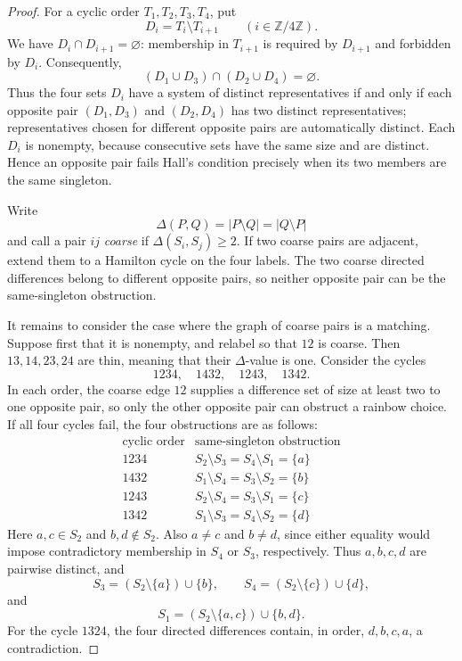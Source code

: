 \documentclass[11pt]{amsart}
\theoremstyle{definition}
\begin{document}
\begin{proof}
For a cyclic order $T_1,T_2,T_3,T_4$, put
\[
  D_i=T_i\setminus T_{i+1}
  \qquad(i\in\mathbb Z/4\mathbb Z).
\]
We have $D_i\cap D_{i+1}=\varnothing$: membership in $T_{i+1}$
is required by $D_{i+1}$ and forbidden by $D_i$.  Consequently,
\[
  (D_1\cup D_3)\cap(D_2\cup D_4)=\varnothing.
\]
Thus the four sets $D_i$ have a system of distinct representatives if
and only if each opposite pair $(D_1,D_3)$ and $(D_2,D_4)$ has two
distinct representatives; representatives chosen for different opposite
pairs are automatically distinct.  Each $D_i$ is nonempty, because
consecutive sets have the same size and are distinct.  Hence an opposite
pair fails Hall's condition precisely when its two members are the same
singleton.

Write
\[
  \Delta(P,Q)=|P\setminus Q|=|Q\setminus P|
\]
and call a pair $ij$ \emph{coarse} if $\Delta(S_i,S_j)\ge2$.  If two coarse pairs are adjacent, extend them to a Hamilton cycle on the four labels.  The two coarse directed differences belong to different opposite pairs, so neither opposite pair can be the same-singleton obstruction.

It remains to consider the case where the graph of coarse pairs is a matching.  Suppose first that it is nonempty, and relabel so that $12$ is coarse.  Then $13,14,23,24$ are thin, meaning that their $\Delta$-value is one.  Consider the cycles
\[
  1234,\quad1432,\quad1243,\quad1342.
\]
In each order, the coarse edge $12$ supplies a difference set of size at
least two to one opposite pair, so only the other opposite pair can
obstruct a rainbow choice.  If all four cycles fail, the four obstructions
are as follows:
\[
\begin{array}{c|c}
\text{cyclic order}&\text{same-singleton obstruction}\\ \hline
1234&S_2\setminus S_3=S_4\setminus S_1=\{a\}\\
1432&S_1\setminus S_4=S_3\setminus S_2=\{b\}\\
1243&S_2\setminus S_4=S_3\setminus S_1=\{c\}\\
1342&S_1\setminus S_3=S_4\setminus S_2=\{d\}
\end{array}
\]
Here $a,c\in S_2$ and $b,d\notin S_2$.  Also $a\ne c$ and $b\ne d$, since either equality would impose contradictory membership in $S_4$ or $S_3$, respectively.  Thus $a,b,c,d$ are pairwise distinct, and
\[
  S_3=(S_2\setminus\{a\})\cup\{b\},\qquad
  S_4=(S_2\setminus\{c\})\cup\{d\},
\]
and
\[
  S_1=(S_2\setminus\{a,c\})\cup\{b,d\}.
\]
For the cycle $1324$, the four directed differences contain, in order, $d,b,c,a$, a contradiction.


\end{proof}
\end{document}
